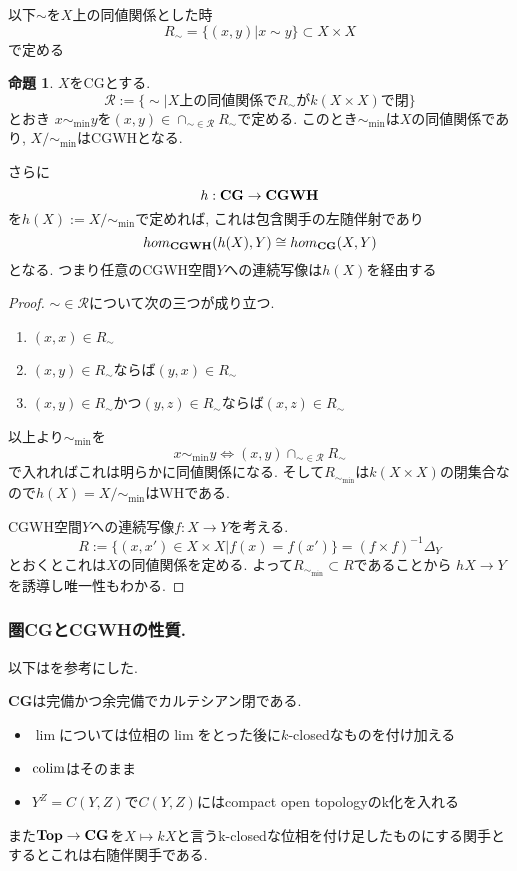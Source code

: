 \documentclass[dvipdfmx,a4paper,11pt]{article}
\newcommand{\colim}{{\rm colim}}
\theoremstyle{definition}
\newtheorem{prop}[thm]{命題}
\begin{document}
以下$\sim$を$X$上の同値関係とした時
$$
R_{\sim}= \{ (x,y)| x \sim y\} \subset X \times X
$$
で定める
 \begin{tcolorbox}
 [colback = white, colframe = green!35!black, fonttitle = \bfseries,breakable = true]
\begin{prop}\cite[Prop2.22]{Str}
$X$をCGとする.
$$
\mathcal{R}:=\{\sim | \text{$X$上の同値関係で$R_{\sim}$が$k(X \times X)$で閉} \}
$$
とおき
$x \sim_{\min} y$を$(x,y) \in \cap_{\sim \in \mathcal{R}} R_{\sim}$で定める.
このとき$\sim_{\min}$は$X$の同値関係であり, $X/\sim_{\min}$はCGWHとなる.

さらに
$$
h : {\bf CG } \to {\bf CGWH}
$$
を$h(X) := X/\sim_{\min}$で定めれば, これは包含関手の左随伴射であり
$$
hom_{{\bf CGWH}}(h(X), Y) \cong hom_{{\bf CG}}(X, Y)
$$
となる. 
つまり任意のCGWH空間$Y$への連続写像は$h(X)$を経由する

\end{prop}
\end{tcolorbox}

\begin{proof}

$\sim \in \mathcal{R}$について次の三つが成り立つ.
\begin{enumerate}
\item $(x,x) \in R_{\sim}$
\item $(x,y)\in R_{\sim}$ならば$(y,x) \in R_{\sim}$
\item $(x,y) \in R_{\sim}$かつ$(y,z) \in R_{\sim}$ならば$(x,z) \in R_{\sim}$
\end{enumerate}
以上より$\sim_{\min}$を
$$
x \sim_{\min} y
\Leftrightarrow
(x,y) \cap_{\sim \in \mathcal{R}} R_{\sim}
$$
で入れればこれは明らかに同値関係になる.
そして$R_{\sim_{\min}}$は$k(X \times X)$の閉集合なので$h(X)=X/\sim_{\min}$はWHである.

CGWH空間$Y$への連続写像$f : X \to Y$を考える.
$$
R:= \{ (x, x') \in X \times X | f(x) = f(x')\}=(f \times f)^{-1}\Delta_{Y}
$$
とおくとこれは$X$の同値関係を定める.
よって$R_{\sim_{\min}} \subset R$であることから
$hX \to Y$を誘導し唯一性もわかる.  
\end{proof}



\subsubsection{圏{\bf CG}と{\bf CGWH}の性質.}
以下は\cite{Fra}を参考にした. 

\begin{tcolorbox}
 [colback = white, colframe = green!35!black, fonttitle = \bfseries,breakable = true]
 {\bf CG}は完備かつ余完備でカルテシアン閉である.
 \begin{itemize}
 \item $\lim$については位相の$\lim$をとった後に$k$-closedなものを付け加える
 \item $\colim$はそのまま
 \item $Y^{Z} = C(Y,Z)$で$C(Y,Z)$にはcompact open topologyのk化を入れる
 \end{itemize}
 また$ {\bf Top}\to { \bf CG }$を$X \mapsto kX$と言うk-closedな位相を付け足したものにする関手とするとこれは右随伴関手である. 
\end{tcolorbox}
\end{document}
